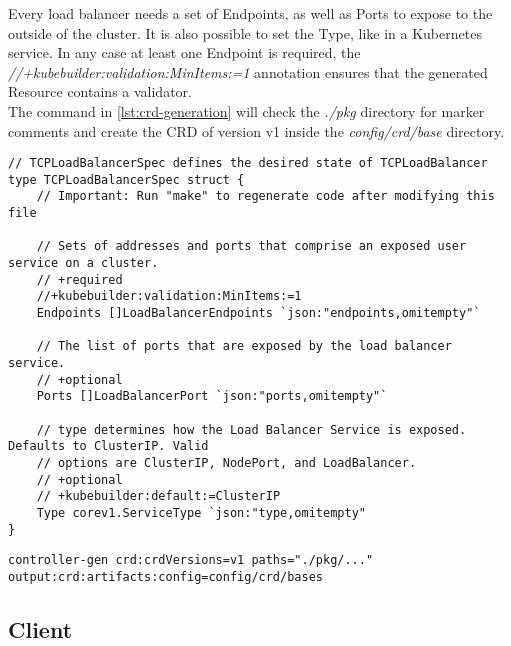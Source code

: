 Every load balancer needs a set of Endpoints, as well as Ports to expose to the outside of the cluster.
It is also possible to set the Type, like in a Kubernetes service.
In any case at least one Endpoint is required, the \textit{//+kubebuilder:validation:MinItems:=1} annotation ensures that the generated Resource contains a validator.
\\
The command in \autoref{lst:crd-generation} will check the \textit{./pkg} directory for marker comments and create the CRD of version v1 inside the \textit{config/crd/base} directory.
\\
\begin{lstlisting}[caption={TCPLoadBalancerSpec struct}, label={lst:tcpbl-spec}]
// TCPLoadBalancerSpec defines the desired state of TCPLoadBalancer
type TCPLoadBalancerSpec struct {
	// Important: Run "make" to regenerate code after modifying this file

	// Sets of addresses and ports that comprise an exposed user service on a cluster.
	// +required
	//+kubebuilder:validation:MinItems:=1
	Endpoints []LoadBalancerEndpoints `json:"endpoints,omitempty"`

	// The list of ports that are exposed by the load balancer service.
	// +optional
	Ports []LoadBalancerPort `json:"ports,omitempty"`

	// type determines how the Load Balancer Service is exposed. Defaults to ClusterIP. Valid
	// options are ClusterIP, NodePort, and LoadBalancer.
	// +optional
	// +kubebuilder:default:=ClusterIP
	Type corev1.ServiceType `json:"type,omitempty"
}
\end{lstlisting}

\begin{lstlisting}[numbers=none, caption={Generate CRD YAML files with controller-gen}, label={lst:crd-generation}]
	controller-gen crd:crdVersions=v1 paths="./pkg/..." output:crd:artifacts:config=config/crd/bases
\end{lstlisting}

\subsection{Client}\label{subsec:client}


